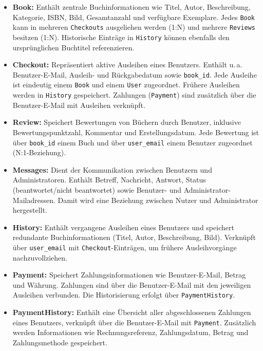 \begin{itemize}
	\item \textbf{Book:} Enthält zentrale Buchinformationen wie Titel, Autor, Beschreibung, Kategorie, ISBN, Bild, Gesamtanzahl und verfügbare Exemplare. 
	Jedes \texttt{Book} kann in mehreren \texttt{Checkouts} ausgeliehen werden (1:N) und mehrere \texttt{Reviews} besitzen (1:N). 
	Historische Einträge in \texttt{History} können ebenfalls den ursprünglichen Buchtitel referenzieren.
	
	\item \textbf{Checkout:} Repräsentiert aktive Ausleihen eines Benutzers. Enthält u.\,a. Benutzer-E-Mail, Ausleih- und Rückgabedatum sowie \texttt{book\_id}. 
	Jede Ausleihe ist eindeutig einem \texttt{Book} und einem \texttt{User} zugeordnet. Frühere Ausleihen werden in \texttt{History} gespeichert. 
	Zahlungen (\texttt{Payment}) sind zusätzlich über die Benutzer-E-Mail mit Ausleihen verknüpft.
	
	\item \textbf{Review:} Speichert Bewertungen von Büchern durch Benutzer, inklusive Bewertungspunktzahl, Kommentar und Erstellungsdatum. 
	Jede Bewertung ist über \texttt{book\_id} einem Buch und über \texttt{user\_email} einem Benutzer zugeordnet (N:1-Beziehung).
	
	\item \textbf{Messages:} Dient der Kommunikation zwischen Benutzern und Administratoren. 
	Enthält Betreff, Nachricht, Antwort, Status (beantwortet/nicht beantwortet) sowie Benutzer- und Administrator-Mailadressen. 
	Damit wird eine Beziehung zwischen Nutzer und Administrator hergestellt.
	
	\item \textbf{History:} Enthält vergangene Ausleihen eines Benutzers und speichert redundante Buchinformationen (Titel, Autor, Beschreibung, Bild). 
	Verknüpft über \texttt{user\_email} mit \texttt{Checkout}-Einträgen, um frühere Ausleihvorgänge nachzuvollziehen.
	
	\item \textbf{Payment:} Speichert Zahlungsinformationen wie Benutzer-E-Mail, Betrag und Währung. 
	Zahlungen sind über die Benutzer-E-Mail mit den jeweiligen Ausleihen verbunden. 
	Die Historisierung erfolgt über \texttt{PaymentHistory}.
	
	\item \textbf{PaymentHistory:} Enthält eine Übersicht aller abgeschlossenen Zahlungen eines Benutzers, verknüpft über die Benutzer-E-Mail mit \texttt{Payment}. 
	Zusätzlich werden Informationen wie Rechnungsreferenz, Zahlungsdatum, Betrag und Zahlungsmethode gespeichert.
\end{itemize}

